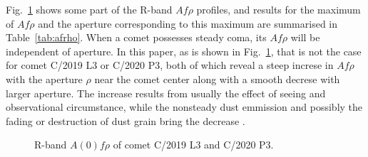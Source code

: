 Fig.~\ref{fig:Afrho} shows some part of the R-band $Af\rho$ profiles, and results for the maximum of $Af\rho$ and the aperture corresponding to this maximum are summarised in Table~\ref{tab:afrho}. When a comet possesses steady coma, its $Af\rho$ will be independent of aperture. In this paper, as is shown in Fig.~\ref{fig:Afrho}, that is not the case for comet C/2019 L3 or C/2020 P3, both of which reveal a steep increse in $Af\rho$ with the aperture $\rho$ near the comet center along with a smooth decrese with larger aperture. The increase results from usually the effect of seeing and observational circumstance, while the nonsteady dust emmission and possibly the fading or destruction of dust grain bring the decrease \citep{lara_behaviour_2003,tozzi_imaging_2003}.  
             


\begin{figure}
    \centering

    \caption{R-band $A(0)f\rho$ of comet C/2019 L3 and C/2020 P3. }
    \label{fig:Afrho}
\end{figure}

